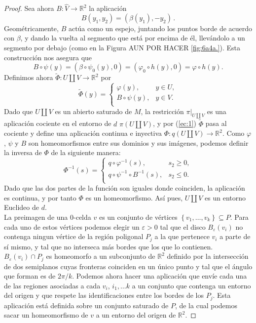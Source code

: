 \documentclass[10pt]{report}
\newcommand{\R}{\mathbb{R}}
\theoremstyle{definition}
\begin{document}
\begin{proof}
Sea ahora $B:\widehat{V}\to \R^2$ la aplicación $$B(y_1,y_2)=\left(\beta (y_1), -y_2\right)\, .$$
Geométricamente, $B$ actúa como un espejo, juntando los puntos borde de acuerdo con $\beta$, y dando la vuelta al segmento que está por encima de él, llevándolo a un segmento por debajo (como en la Figura AUN POR HACER \autoref{fig:6a4a.}). Esta construcción nos asegura que 
\begin{equation}\label{ec:1}
B\circ \psi(y)=\left(\beta \circ \psi_0(y),0\right)=\left(\varphi_0 \circ h(y),0\right)=\varphi \circ h(y).
\end{equation}
Definimos ahora $\tilde{\Phi}:U\amalg V\to \R^2$ por $$\tilde{\Phi}(y)=\begin{cases}
\varphi(y), & y\in U,\\
B\circ \psi (y), & y\in V.\\
\end{cases}$$
Dado que $U\amalg V$ es un abierto saturado de $M$, la restricción $\pi|_{U\amalg V}$ es una aplicación cociente en el entorno de $d$ $\pi (U\amalg V)$, y por (\ref{ec:1}) $\tilde{\Phi}$ pasa al cociente y define una aplicación continua e inyectiva $\Phi :q(U\amalg V)\to \R^2$. Como $\varphi$, $\psi$ y $B$ son homeomorfismos entre sus dominios y sus imágenes, podemos definir la inversa de $\Phi$ de la siguiente manera:
$$\Phi ^{-1}(s)= \begin{cases} 
q\circ \varphi ^{-1}(s), & s_2\geq 0, \\
q\circ \psi ^{-1} \circ B^{-1}(s), & s_2\leq 0.\\
 \end{cases}$$
Dado que las dos partes de la función son iguales donde coinciden, la aplicación es continua, y por tanto $\Phi$ es un homeomorfismo. Así pues, $U\amalg V$ es un entorno Euclideo de $d$.\\
La preimagen de una 0-celda $v$ es un conjunto de vértices $\left\{v_1,\dots ,v_k\right\} \subseteq P$. Para cada uno de estos vértices podemos elegir un $\varepsilon>0$ tal que el disco $B_{\varepsilon}(v_i)$ no contenga ningun vértice de la región poligonal $P_j$ a la que pertenece $v_i$ a parte de sí mismo, y tal que no interseca más bordes que los que lo contienen. $B_{\varepsilon}(v_i)\cap P_j$ es homeomorfo a un subconjunto de $\R^2$ definido por la intersección de dos semiplanos cuyas fronteras coinciden en un único punto y tal que el ángulo que forman es de $2\pi /k$. Podemos ahora hacer una aplicación que envíe cada una de las regiones asociadas a cada $v_i$, $i_1,\dots k$ a un conjunto que contenga un entorno del origen y que respete las identificaciones entre los bordes de los $P_j$. Esta aplicación está definida sobre un conjunto saturado de $P$, de la cual podemos sacar un homeomorfismo de $v$ a un entorno del origen de $\R^2$.


\end{proof}
\end{document}
